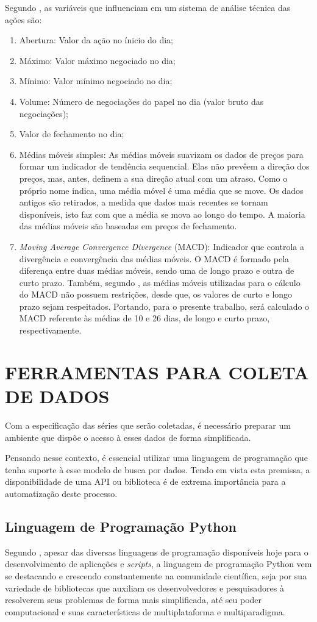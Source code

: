 Segundo , as variáveis que influenciam em um sistema de análise técnica das ações são:

\begin{enumerate}
\item Abertura: Valor da ação no ínicio do dia;
\item Máximo: Valor máximo negociado no dia;
\item Mínimo: Valor mínimo negociado no dia;
\item Volume: Número de negociações do papel no dia (valor bruto das negociações);
\item Valor de fechamento no dia;
\item Médias móveis simples: As médias móveis suavizam os dados de preços para formar um indicador de tendência sequencial. Elas não prevêem a direção dos preços, mas, antes, definem a sua direção atual com um atraso. Como o próprio nome indica, uma média móvel é uma média que se move. Os dados antigos são retirados, a medida que dados mais recentes se tornam disponíveis, isto faz com que a média se mova ao longo do tempo. A maioria das médias móveis são baseadas em preços de fechamento.
\item \textit{Moving Average Convergence Divergence} (MACD): Indicador que controla a divergência e convergência das médias móveis. O MACD é formado pela diferença entre duas médias móveis, sendo uma de longo prazo e outra de curto prazo. Também, segundo , as médias móveis utilizadas para o cálculo do MACD não possuem restrições, desde que, os valores de curto e longo prazo sejam respeitados. Portando, para o presente trabalho, será calculado o MACD referente às médias de 10 e 26 dias, de longo e curto prazo, respectivamente.
\end{enumerate}

\section{FERRAMENTAS PARA COLETA DE DADOS}
Com a especificação das séries que serão coletadas, é necessário preparar um ambiente que dispõe o acesso à esses dados de forma simplificada. 

Pensando nesse contexto, é essencial utilizar uma linguagem de programação que tenha suporte à esse modelo de busca por dados. Tendo em vista esta premissa, a disponibilidade de uma API ou biblioteca é de extrema importância para a automatização deste processo.

\subsection{Linguagem de Programação Python}
Segundo , apesar das diversas linguagens de programação disponíveis hoje para o desenvolvimento de aplicações e \textit{scripts}, a linguagem de programação Python vem se destacando e crescendo constantemente na comunidade científica, seja por sua variedade de bibliotecas que auxiliam os desenvolvedores e pesquisadores à resolverem seus problemas de forma mais simplificada, até seu poder computacional e suas características de multiplataforma e multiparadigma.

